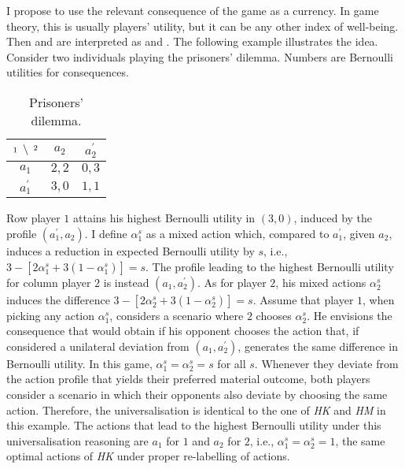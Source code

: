 I propose to use the relevant consequence of the game as a currency. In game theory, this is usually players' utility, but it can be any other index of well-being. Then  and  are interpreted as  and . The following example illustrates the idea. Consider two individuals playing the prisoners' dilemma. Numbers are Bernoulli utilities for consequences.

\begin{table}[H]
	\begin{center}
		\begin{tabular}{c | c c}
			\(\uglyfrac{\hspace*{0.1cm} 2}{1 \hspace*{0.1cm}}\) & \(a_{2}\) & \(a_{2}^{\prime}\) \\
			\hline
			\(a_{1}\)                                           & \(2,2\)   & \(0,3\)            \\
			\(a_{1}^{\prime}\)                                  & \(3,0\)   & \(1,1\)
		\end{tabular}
		\caption{Prisoners' dilemma.}
	\end{center}
\end{table}

Row player \(1\) attains his highest Bernoulli utility in \((3, 0 )\), induced by the profile \((a^{\prime}_1, a_{2} )\). I define \( \alpha_1^{s} \) as a mixed action which, compared to \( a_1^{\prime} \), given \( a_2 \), induces a reduction in expected Bernoulli utility by \( s \), i.e., \( 3 - [ 2 \alpha_1^{s} + 3 ( 1 - \alpha_1^{s} ) ] = s \). The profile leading to the highest Bernoulli utility for column player \(2\) is instead \((a_1,a_2^{\prime} )\). As for player \(2\), his mixed actions \(\alpha_2^{s}\) induces the difference \( 3 - [ 2 \alpha_2^{s} + 3 ( 1 - \alpha_2^{s} ) ] = s \). Assume that player \(1\), when picking any action \(\alpha_1^{s}\), considers a scenario where \(2\) chooses \(\alpha_2^{s}\). He envisions the consequence that would obtain if his opponent chooses the action that, if considered a unilateral deviation from \((a_1,a_2^{\prime} )\), generates the same difference in Bernoulli utility. In this game, \(\alpha_1^{s} = \alpha_2^{s} = s\) for all \(s\). Whenever they deviate from the action profile that yields their preferred material outcome, both players consider a scenario in which their opponents also deviate by choosing the same action. Therefore, the universalisation is identical to the one of \textit{HK} and \textit{HM} in this example. The actions that lead to the highest Bernoulli utility under this universalisation reasoning are \(a_1\) for \(1\) and \(a_2\) for \(2\), i.e., \( \alpha_1^{s} = \alpha_2^{s} = 1 \), the same optimal actions of \textit{HK} under proper re-labelling of actions.

